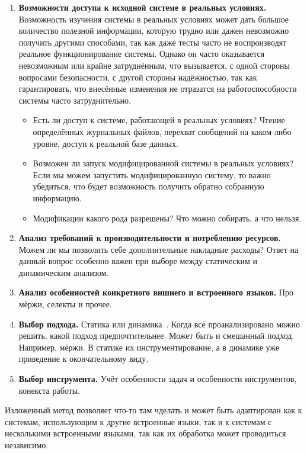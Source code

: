 \begin{enumerate}
  \item \textbf{Возможности доступа к исходной системе в реальных условиях.} Возможность изучения системы в реальных условиях может дать большое количество полезной информации, которую трудно или дажен невозможно получить другими способами, так как даже тесты часто не воспроизводят реальное функционирование системы. Однако он часто оказывается невозможным или крайне затруднённым, что вызывается, с одной стороны вопросами безопасности, с другой стороны надёжностью, так как гарантировать, что внесённые изменения не отразатся на работоспособности системы часто затруднительно.  
  \begin{itemize}
    \item Есть ли доступ к системе, работающей в реальных условиях? Чтение определённых журнальных файлов, перехват сообщений на каком-либо уровне, доступ к реальной базе данных.
    \item Возможен ли запуск модифицированной системы в реальных условиях? Если мы можем запустить модифицированную систему, то важно убедиться, что будет возможность получить обратно собранную информацию.
    \item Модификации какого рода разрешены? Что можно собирать, а что нельзя.
  \end{itemize}
  
  \item \textbf{Анализ требований к производительности и потреблению ресурсов.} Можем ли мы позволить себе дополнительные накладные расходы? Ответ на данный вопрос особенно важен при выборе между статическим и динамическим анализом.
  
  \item \textbf{Анализ особенностей конкретного вншнего и встроенного языков.} Про мёржи, селекты и прочее.
  
  \item \textbf{Выбор подхода.} Статика или динамика~\cite{OpenSystem}. Когда всё проанализировано можно решить, какой подход предпочтительнее. Может быть и смешанный подход. Например, мёржи. В статике их инструментирование, а в динамике уже приведение к окончательному виду.
  
  \item \textbf{Выбор инструмента.} Учёт особенности задач и особенности инструментов, конекста работы.
  
\end{enumerate}

Изложенный метод позволяет что-то там чделать и может быть адаптирован как к системам, использующим к другие встроенные языки, так и к системам с несколькими встроенными языками, так как их обработка может проводиться независимо. 

\clearpage
